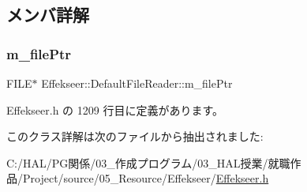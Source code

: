 \subsection{メンバ詳解}
\mbox{\label{class_effekseer_1_1_default_file_reader_a8377211af30419cd2a8b6d220fe8972d}} 
\subsubsection{\texorpdfstring{m\+\_\+file\+Ptr}{m\_filePtr}}
{\footnotesize\ttfamily F\+I\+LE$\ast$ Effekseer\+::\+Default\+File\+Reader\+::m\+\_\+file\+Ptr\hspace{0.3cm}{\ttfamily [private]}}



 Effekseer.\+h の 1209 行目に定義があります。



このクラス詳解は次のファイルから抽出されました\+:\begin{DoxyCompactItemize}
\item 
C\+:/\+H\+A\+L/\+P\+G関係/03\+\_\+作成プログラム/03\+\_\+\+H\+A\+L授業/就職作品/\+Project/source/05\+\_\+\+Resource/\+Effekseer/\mbox{\hyperlink{_effekseer_8h}{Effekseer.\+h}}\end{DoxyCompactItemize}
